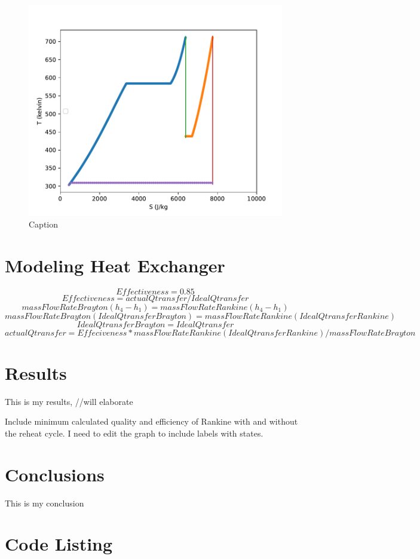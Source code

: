 \documentclass{article}
\begin{document}
\begin{figure}
    \centering
    \includegraphics{Fig_test.pdf}
    \caption{Caption}
    
    \label{fig:my_label}
\end{figure}

\FloatBarrier

\section{Modeling Heat Exchanger}
    \[Effectiveness = 0.85\]
   \[Effectiveness = actual Q transfer/ Ideal Q transfer\]
   \[massFlowRateBrayton(h_4 - h_1) = massFlowRateRankine(h_4 - h_1)\]
   \[massFlowRateBrayton(Ideal Q transfer Brayton) = massFlowRateRankine(Ideal Q transfer Rankine)\]
   \[Ideal Q transfer Brayton = Ideal Q transfer\]
   \[actualQtransfer = Effeciveness * massFlowRateRankine(Ideal Q transfer Rankine) / massFlowRateBrayton\]



\section{Results}

This is my results, //will elaborate


Include minimum calculated quality and efficiency of Rankine with and without the reheat cycle. I need to edit the graph to include labels with states.

\section{Conclusions}

This is my conclusion

\appendix

\FloatBarrier %





\section*{Code Listing}


\end{document}
